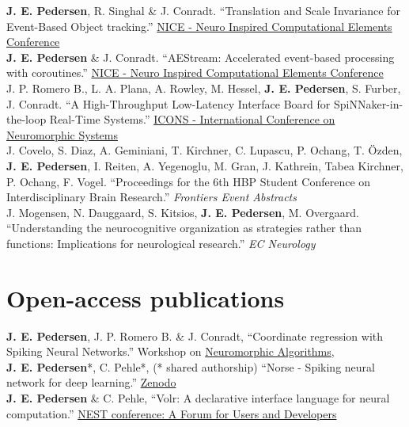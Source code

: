 \documentclass[11pt, a4paper]{article}
\newcommand{\years}[1]{\marginnote{\scriptsize #1}}
\begin{document}
\years{2023} \textbf{J. E. Pedersen}, R. Singhal \& J. Conradt.
``Translation and Scale Invariance for Event-Based Object tracking.''
\href{https://dl.acm.org/conference/nice}{NICE - Neuro Inspired Computational Elements Conference} \\
\years{2023} \textbf{J. E. Pedersen} \& J. Conradt.
``AEStream: Accelerated event-based processing with coroutines.''
\href{https://dl.acm.org/conference/nice}{NICE - Neuro Inspired Computational Elements Conference} \\
\years{2023} J. P. Romero B., L. A. Plana, A. Rowley, M. Hessel, \textbf{J. E. Pedersen}, S. Furber, J. Conradt.
``A High-Throughput Low-Latency Interface Board for SpiNNaker-in-the-loop Real-Time Systems.''
\href{https://icons.ornl.gov/}{ICONS - International Conference on Neuromorphic Systems} \\
\years{2022} J. Covelo, S. Diaz, A. Geminiani, T. Kirchner, C. Lupascu,
P. Ochang, T. Özden, \textbf{J. E. Pedersen}, I. Reiten, A. Yegenoglu, M. Gran, J. Kathrein, Tabea Kirchner, P. Ochang, F. Vogel.
``Proceedings for the 6th HBP Student Conference on Interdisciplinary Brain Research.''
\emph{Frontiers Event Abstracts} \\
\years{2018} J. Mogensen, N. Dauggaard, S. Kitsios, \textbf{J. E. Pedersen}, M. Overgaard.
``Understanding the neurocognitive organization as strategies rather than functions: Implications for neurological research.''
\emph{EC Neurology}

\section*{Open-access publications}
\years{2022} \textbf{J. E. Pedersen}, J. P. Romero B. \& J. Conradt, 
``Coordinate regression with Spiking Neural Networks.''
Workshop on \href{https://neal2022.tetzlab.com/}{Neuromorphic Algorithms}, \\
\years{2020} \textbf{J. E. Pedersen}*, C. Pehle*, (* shared authorship) 
``Norse - Spiking neural network for deep learning.''
\href{https://zenodo.org/record/4422025}{Zenodo}
\\
\years{2018} \textbf{J. E. Pedersen} \& C. Pehle, 
``Volr: A declarative interface language for neural computation.''
\href{https://indico-jsc.fz-juelich.de/event/71/}{NEST conference: A Forum for Users and Developers}\\
\end{document}
